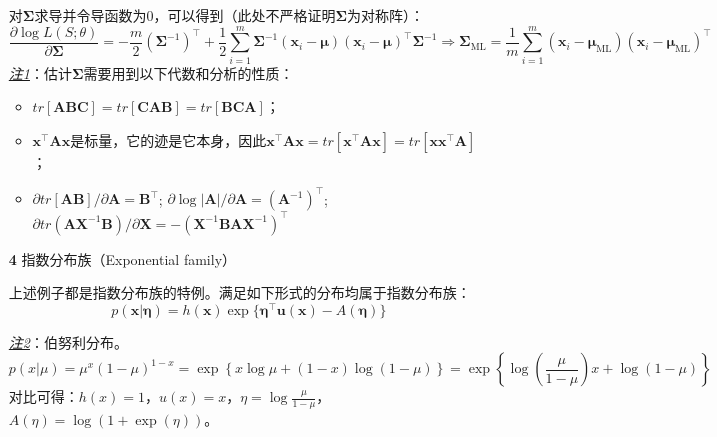 \documentclass{article}
\begin{document}
\begin{itemize}
\begin{scriptsize}
\begin{spacing}{1.2}
{	对$\bm{\Sigma}$求导并令导函数为0，可以得到（此处不严格证明$\bm{\Sigma}$为对称阵）：
	\begin{equation*}
	\frac{\partial \log L(S;\theta)}{\partial \bm{\Sigma}} = -\frac{m}{2} (\bm{\Sigma}^{-1})^\top + \frac{1}{2} \sum_{i=1}^m  \bm{\Sigma}^{-1} (\bm{x}_i - \bm{\mu})(\bm{x}_i - \bm{\mu})^\top \bm{\Sigma}^{-1} \Rightarrow \bm{\Sigma}_{\mathrm{ML}} = \frac{1}{m}\sum_{i=1}^m (\bm{x}_i - \bm{\mu}_{\mathrm{ML}})(\bm{x}_i - \bm{\mu}_{\mathrm{ML}})^\top
	\end{equation*}
	\textit{\underline{注1}}：估计$\bm{\Sigma}$需要用到以下代数和分析的性质：	
	\begin{itemize}
	\item $tr[\bm{A}\bm{B}\bm{C}]=tr[\bm{C}\bm{A}\bm{B}]=tr[\bm{B}\bm{C}\bm{A}]$；
	\item $\bm{x}^\top \bm{A} \bm{x}$是标量，它的迹是它本身，因此$\bm{x}^\top \bm{A} \bm{x} = tr[\bm{x}^\top \bm{A} \bm{x}] = tr[\bm{x} \bm{x}^\top \bm{A}]$；
	\item $\partial tr[\bm{A} \bm{B}]/\partial \bm{A} = \bm{B}^\top$; $\partial \log |\bm{A}|/\partial \bm{A} = (\bm{A}^{-1})^\top$; $\partial tr(\bm{A}\bm{X}^{-1}\bm{B})/\partial \bm{X} = -(\bm{X}^{-1} \bm{BA}\bm{X}^{-1})^\top$
	\end{itemize}
	}
	\end{spacing}
	\end{scriptsize}
	\vspace{-2mm}
	
	\item [\textbf{4}] 指数分布族（Exponential family）
	
	上述例子都是指数分布族的特例。满足如下形式的分布均属于指数分布族：
	\begin{equation}
	p(\bm{x}|\bm{\eta}) = h(\bm{x}) \exp\{ \bm{\eta}^\top \bm{u}(\bm{x}) - A(\bm{\eta}) \}
	\end{equation}

	\vspace{1mm}
	\begin{scriptsize}
	\begin{spacing}{1.2}
	{\sffamily
	\textit{\underline{注2}}：伯努利分布。
	\begin{equation*}
	p(x|\mu) = \mu^x(1-\mu)^{1-x} 
	= \exp \left\{ x \log \mu + (1-x) \log (1-\mu) \right\}
	= \exp\left\{ \log \left( \frac{\mu}{1-\mu}\right) x + \log(1-\mu)\right\}
	\end{equation*}
对比可得：$h(x)=1$，$u(x)=x$，$\eta=\log \frac{\mu}{1-\mu} $，$A(\eta)=\log (1+\exp(\eta))$。

}
\end{spacing}
\end{scriptsize}
\end{itemize}
\end{document}
